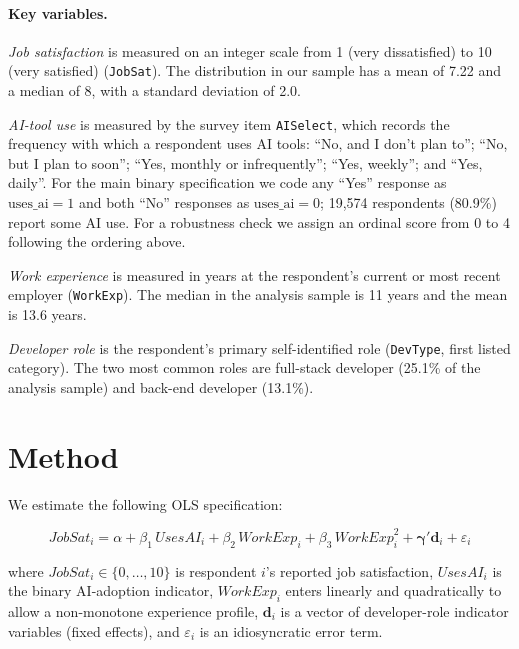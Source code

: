 \documentclass[11pt]{article}
\begin{document}
\paragraph{Key variables.}
\textit{Job satisfaction} is measured on an integer scale from 1 (very
dissatisfied) to 10 (very satisfied) (\texttt{JobSat}). The distribution in
our sample has a mean of 7.22 and a median of 8, with a standard deviation
of 2.0.

\textit{AI-tool use} is measured by the survey item \texttt{AISelect}, which
records the frequency with which a respondent uses AI tools: ``No, and I
don't plan to''; ``No, but I plan to soon''; ``Yes, monthly or
infrequently''; ``Yes, weekly''; and ``Yes, daily''. For the main binary
specification we code any ``Yes'' response as $\text{uses\_ai} = 1$ and both
``No'' responses as $\text{uses\_ai} = 0$; 19,574 respondents (80.9\%) report
some AI use. For a robustness check we assign an ordinal score from 0 to 4
following the ordering above.

\textit{Work experience} is measured in years at the respondent's current or
most recent employer (\texttt{WorkExp}). The median in the analysis sample is
11 years and the mean is 13.6 years.

\textit{Developer role} is the respondent's primary self-identified
role (\texttt{DevType}, first listed category). The two most common roles are
full-stack developer (25.1\% of the analysis sample) and back-end developer
(13.1\%).

\section{Method}

We estimate the following OLS specification:

\begin{equation}
  \mathit{JobSat}_{i}
    = \alpha
    + \beta_{1}\,\mathit{UsesAI}_{i}
    + \beta_{2}\,\mathit{WorkExp}_{i}
    + \beta_{3}\,\mathit{WorkExp}_{i}^{2}
    + \boldsymbol{\gamma}'\mathbf{d}_{i}
    + \varepsilon_{i}
  \label{eq:main}
\end{equation}

\noindent
where $\mathit{JobSat}_{i} \in \{0,\ldots,10\}$ is respondent $i$'s
reported job satisfaction, $\mathit{UsesAI}_{i}$ is the binary AI-adoption
indicator, $\mathit{WorkExp}_{i}$ enters linearly and quadratically to allow
a non-monotone experience profile, $\mathbf{d}_{i}$ is a vector of
developer-role indicator variables (fixed effects), and $\varepsilon_{i}$ is
an idiosyncratic error term.
\end{document}
